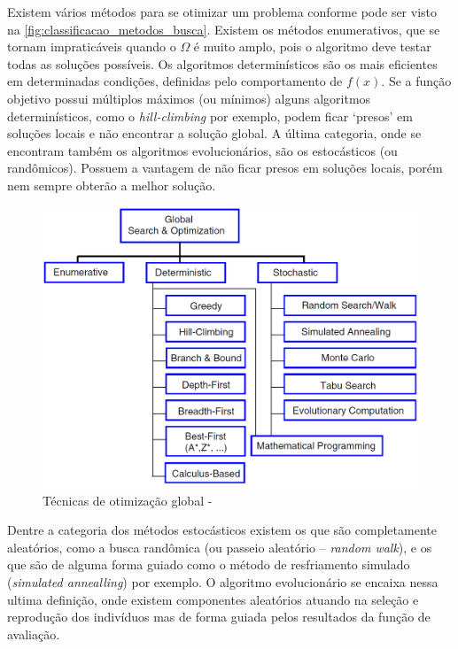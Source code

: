 Existem vários métodos para se otimizar um problema conforme pode ser visto na \autoref{fig:classificacao_metodos_busca}. Existem os métodos enumerativos, que se tornam impraticáveis quando o \(\Omega\) é muito amplo, pois o algoritmo deve testar todas as soluções possíveis. Os algoritmos determinísticos são os mais eficientes em determinadas condições, definidas pelo comportamento de \(f(x)\). Se a função objetivo possui múltiplos máximos (ou mínimos) alguns algoritmos determinísticos, como o \textit{hill-climbing} por exemplo, podem ficar `presos' em soluções locais e não encontrar a solução global. A última categoria, onde se encontram também os algoritmos evolucionários, são os estocásticos (ou randômicos). Possuem a vantagem de não ficar presos em soluções locais, porém nem sempre obterão a melhor solução.

\begin{figure}[ht]
	\includegraphics[width=\linewidth]{imagens/classificacao_metodos_busca.png}
	\caption{Técnicas de otimização global - \cite{Coello2007}}
	\label{fig:classificacao_metodos_busca}
\end{figure}

Dentre a categoria dos métodos estocásticos existem os que são completamente aleatórios, como a busca randômica (ou passeio aleatório -- \textit{random walk}), e os que são de alguma forma guiado como o método de resfriamento simulado (\textit{simulated annealling}) por exemplo. O algoritmo evolucionário se encaixa nessa ultima definição, onde existem componentes aleatórios atuando na seleção e reprodução dos indivíduos mas de forma guiada pelos resultados da função de avaliação.

